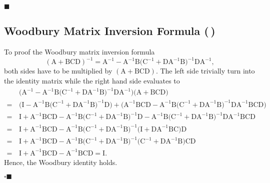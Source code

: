 \documentclass[11pt, a4paper]{scrartcl}
\newcommand{\mat}[1]{\bm{\mathrm{#1}}}
\newcommand{\eot}{\hfill\(\blacksquare\)}
\newcommand{\qedeot}{\hfill\(\square\blacksquare\)}
\newcommand{\diffstar}{\texorpdfstring{\raisebox{-1pt}{\resizebox{!}{8pt}{\(\star\)}}}{*}}
\newcommand{\twostar}  {(\diffstar\,\diffstar)}
\begin{document}
			\eot

		\subsection{Woodbury Matrix Inversion Formula  \twostar}
			To proof the Woodbury matrix inversion formula
			\begin{equation}
				(\mat{A} + \mat{B} \mat{C} \mat{D})^{-1} = \mat{A}^{-1} - \mat{A}^{-1} \mat{B} \big( \mat{C}^{-1} + \mat{D} \mat{A}^{-1} \mat{B} \big)^{-1} \mat{D} \mat{A}^{-1},
			\end{equation}
			both sides have to be multiplied by \( (\mat{A} + \mat{B} \mat{C} \mat{D}) \). The left side trivially turn into the identity matrix while the right hand side evaluates to
			\begin{align}
				 &\, \Big( \mat{A}^{-1} - \mat{A}^{-1} \mat{B} \big( \mat{C}^{-1} + \mat{D} \mat{A}^{-1} \mat{B} \big)^{-1} \mat{D} \mat{A}^{-1} \Big) \big( \mat{A} + \mat{B} \mat{C} \mat{D} \big) \\
				=&\, \Big( \mat{I} - \mat{A}^{-1} \mat{B} \big( \mat{C}^{-1} + \mat{D} \mat{A}^{-1} \mat{B} \big)^{-1} \mat{D} \Big) + \Big( \mat{A}^{-1} \mat{B} \mat{C} \mat{D} - \mat{A}^{-1} \mat{B} \big( \mat{C}^{-1} + \mat{D} \mat{A}^{-1} \mat{B} \big)^{-1} \mat{D} \mat{A}^{-1} \mat{B} \mat{C} \mat{D} \Big) \\
				=&\, \mat{I} + \mat{A}^{-1} \mat{B} \mat{C} \mat{D} - \mat{A}^{-1} \mat{B} \big( \mat{C}^{-1} + \mat{D} \mat{A}^{-1} \mat{B} \big)^{-1} \mat{D} - \mat{A}^{-1} \mat{B} \big( \mat{C}^{-1} + \mat{D} \mat{A}^{-1} \mat{B} \big)^{-1} \mat{D} \mat{A}^{-1} \mat{B} \mat{C} \mat{D} \\
				=&\, \mat{I} + \mat{A}^{-1} \mat{B} \mat{C} \mat{D} - \mat{A}^{-1} \mat{B} \big( \mat{C}^{-1} + \mat{D} \mat{A}^{-1} \mat{B} \big)^{-1} \big( \mat{I} + \mat{D} \mat{A}^{-1} \mat{B} \mat{C} \big) \mat{D} \\
				=&\, \mat{I} + \mat{A}^{-1} \mat{B} \mat{C} \mat{D} - \mat{A}^{-1} \mat{B} \big( \mat{C}^{-1} + \mat{D} \mat{A}^{-1} \mat{B} \big)^{-1} \big( \mat{C}^{-1} + \mat{D} \mat{A}^{-1} \mat{B} \big) \mat{C} \mat{D} \\
				=&\, \mat{I} + \mat{A}^{-1} \mat{B} \mat{C} \mat{D} - \mat{A}^{-1} \mat{B} \mat{C} \mat{D} = \mat{I}.
			\end{align}
			Hence, the Woodbury identity holds.

			\qedeot
\end{document}
